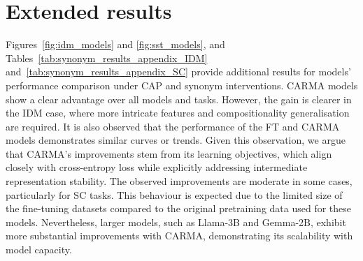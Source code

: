 \section{Extended results}\label{sec:additiona_results}
Figures~\ref{fig:idm_models} and \ref{fig:sst_models}, and Tables~\ref{tab:synonym_results_appendix_IDM} and~\ref{tab:synonym_results_appendix_SC} provide additional results for models' performance comparison under CAP and synonym interventions. 
CARMA models show a clear advantage over all models and tasks. However, the gain is clearer in the IDM case, where more intricate features and compositionality generalisation are required. It is also observed that the performance of the FT and CARMA models demonstrates similar curves or trends. Given this observation, we argue that CARMA's improvements stem from its learning objectives, which align closely with cross-entropy loss while explicitly addressing intermediate representation stability. The observed improvements are moderate in some cases, particularly for SC tasks. This behaviour is expected due to the limited size of the fine-tuning datasets compared to the original pretraining data used for these models. Nevertheless, larger models, such as Llama-3B and Gemma-2B, exhibit more substantial improvements with CARMA, demonstrating its scalability with model capacity.




